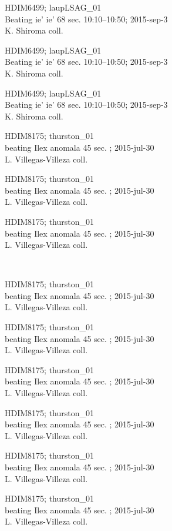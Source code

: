 \documentclass[2pt]{extarticle}
\begin{document}
\noindent
\parbox{0.16\textwidth}{\tiny \raggedright \rule[-0.3\baselineskip]{0pt}{10pt}HDIM6499; laupLSAG\_01\\ Beating ie' ie' 68 sec. 10:10--10:50; 2015-sep-3\\ K. Shiroma coll.}
\parbox{0.16\textwidth}{\tiny \raggedright \rule[-0.3\baselineskip]{0pt}{10pt}HDIM6499; laupLSAG\_01\\ Beating ie' ie' 68 sec. 10:10--10:50; 2015-sep-3\\ K. Shiroma coll.}
\parbox{0.16\textwidth}{\tiny \raggedright \rule[-0.3\baselineskip]{0pt}{10pt}HDIM6499; laupLSAG\_01\\ Beating ie' ie' 68 sec. 10:10--10:50; 2015-sep-3\\ K. Shiroma coll.}
\parbox{0.16\textwidth}{\tiny \raggedright \rule[-0.3\baselineskip]{0pt}{10pt}HDIM8175; thurston\_01\\ beating Ilex anomala 45 sec. ; 2015-jul-30\\ L. Villegas-Villeza coll.}
\parbox{0.16\textwidth}{\tiny \raggedright \rule[-0.3\baselineskip]{0pt}{10pt}HDIM8175; thurston\_01\\ beating Ilex anomala 45 sec. ; 2015-jul-30\\ L. Villegas-Villeza coll.}
\parbox{0.16\textwidth}{\tiny \raggedright \rule[-0.3\baselineskip]{0pt}{10pt}HDIM8175; thurston\_01\\ beating Ilex anomala 45 sec. ; 2015-jul-30\\ L. Villegas-Villeza coll.} \\ 
\vspace{0.001in} 

\noindent
\parbox{0.16\textwidth}{\tiny \raggedright \rule[-0.3\baselineskip]{0pt}{10pt}HDIM8175; thurston\_01\\ beating Ilex anomala 45 sec. ; 2015-jul-30\\ L. Villegas-Villeza coll.}
\parbox{0.16\textwidth}{\tiny \raggedright \rule[-0.3\baselineskip]{0pt}{10pt}HDIM8175; thurston\_01\\ beating Ilex anomala 45 sec. ; 2015-jul-30\\ L. Villegas-Villeza coll.}
\parbox{0.16\textwidth}{\tiny \raggedright \rule[-0.3\baselineskip]{0pt}{10pt}HDIM8175; thurston\_01\\ beating Ilex anomala 45 sec. ; 2015-jul-30\\ L. Villegas-Villeza coll.}
\parbox{0.16\textwidth}{\tiny \raggedright \rule[-0.3\baselineskip]{0pt}{10pt}HDIM8175; thurston\_01\\ beating Ilex anomala 45 sec. ; 2015-jul-30\\ L. Villegas-Villeza coll.}
\parbox{0.16\textwidth}{\tiny \raggedright \rule[-0.3\baselineskip]{0pt}{10pt}HDIM8175; thurston\_01\\ beating Ilex anomala 45 sec. ; 2015-jul-30\\ L. Villegas-Villeza coll.}
\parbox{0.16\textwidth}{\tiny \raggedright \rule[-0.3\baselineskip]{0pt}{10pt}HDIM8175; thurston\_01\\ beating Ilex anomala 45 sec. ; 2015-jul-30\\ L. Villegas-Villeza coll.} \\ 
\vspace{0.001in} 
\end{document}
